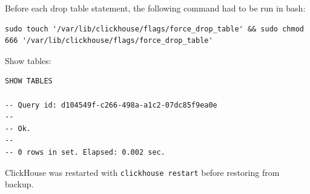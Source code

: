Before each drop table statement, the following command had to be run in bash:
\begin{verbatim}
sudo touch '/var/lib/clickhouse/flags/force_drop_table' && sudo chmod 666 '/var/lib/clickhouse/flags/force_drop_table'
\end{verbatim}

Show tables:
\begin{verbatim}
SHOW TABLES

-- Query id: d104549f-c266-498a-a1c2-07dc85f9ea0e
--
-- Ok.
--
-- 0 rows in set. Elapsed: 0.002 sec.
\end{verbatim}

ClickHouse was restarted with \texttt{clickhouse restart} before restoring from backup.


